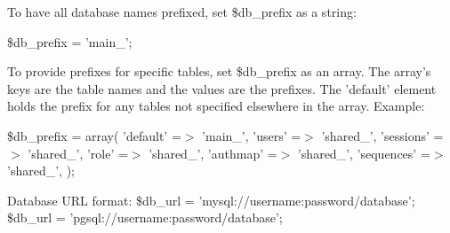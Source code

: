 To have all database names prefixed, set \$db\_\-prefix as a string:

\$db\_\-prefix = 'main\_\-';

To provide prefixes for specific tables, set \$db\_\-prefix as an array. The array's keys are the table names and the values are the prefixes. The 'default' element holds the prefix for any tables not specified elsewhere in the array. Example:

\$db\_\-prefix = array( 'default' =$>$ 'main\_\-', 'users' =$>$ 'shared\_\-', 'sessions' =$>$ 'shared\_\-', 'role' =$>$ 'shared\_\-', 'authmap' =$>$ 'shared\_\-', 'sequences' =$>$ 'shared\_\-', );

Database URL format: \$db\_\-url = 'mysql://username:password/database'; \$db\_\-url = 'pgsql://username:password/database'; 